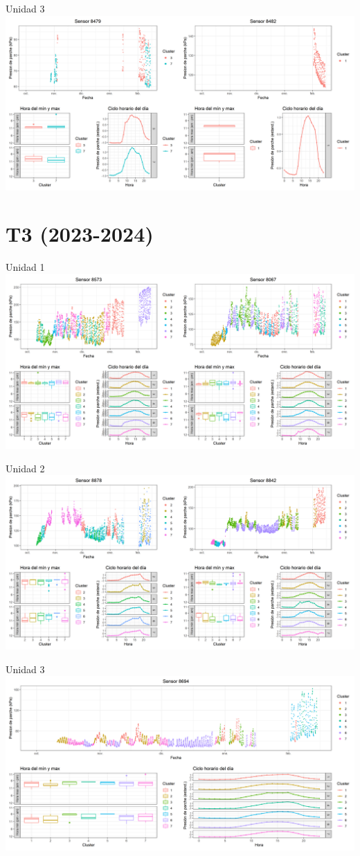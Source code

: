 \documentclass[
  letterpaper,
  DIV=11,
  numbers=noendperiod]{scrreprt}
\begin{document}
Unidad 3
\includegraphics{figuras/02_turgor_limpiado/2023_2024_La_Esperanza_T2_Unidad_3.png}

\chapter{T3 (2023-2024)}

Unidad 1
\includegraphics{figuras/02_turgor_limpiado/2023_2024_La_Esperanza_T3_Unidad_1.png}

Unidad 2
\includegraphics{figuras/02_turgor_limpiado/2023_2024_La_Esperanza_T3_Unidad_2.png}

Unidad 3
\includegraphics{figuras/02_turgor_limpiado/2023_2024_La_Esperanza_T3_Unidad_3.png}
\end{document}
